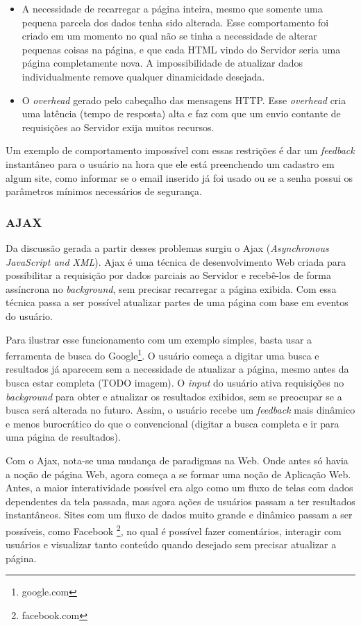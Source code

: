 \documentclass[a4paper,12pt]{article}
\begin{document}
\begin{itemize}
    \item A necessidade de recarregar a página inteira, mesmo que somente uma pequena parcela dos dados tenha sido alterada. Esse comportamento foi criado em um momento no qual não se tinha a necessidade de alterar pequenas coisas na página, e que cada HTML vindo do Servidor seria uma página completamente nova. A impossibilidade de atualizar dados individualmente remove qualquer dinamicidade desejada.

    \item O \emph{overhead} gerado pelo cabeçalho das mensagens HTTP. Esse \emph{overhead} cria uma latência (tempo de resposta) alta e faz com que um envio contante de requisições ao Servidor exija muitos recursos.
\end{itemize}

Um exemplo de comportamento impossível com essas restrições é dar um \emph{feedback} instantâneo para o usuário na hora que ele está preenchendo um cadastro em algum site, como informar se o email inserido já foi usado ou se a senha possui os parâmetros mínimos necessários de segurança.

\subsubsection{AJAX}
Da discussão gerada a partir desses problemas surgiu o Ajax (\emph{Asynchronous JavaScript and XML}). Ajax é uma técnica de desenvolvimento Web criada para possibilitar a requisição por dados parciais ao Servidor e recebê-los de forma assíncrona no \emph{background}, sem precisar recarregar a página exibida. Com essa técnica passa a ser possível atualizar partes de uma página com base em eventos do usuário.

Para ilustrar esse funcionamento com um exemplo simples, basta usar a ferramenta de busca do Google\footnote{google.com}. O usuário começa a digitar uma busca e resultados já aparecem sem a necessidade de atualizar a página, mesmo antes da busca estar completa (TODO imagem). O \emph{input} do usuário ativa requisições no \emph{background} para obter e atualizar os resultados exibidos, sem se preocupar se a busca será alterada no futuro. Assim, o usuário recebe um \emph{feedback} mais dinâmico e menos burocrático do que o convencional (digitar a busca completa e ir para uma página de resultados).

Com o Ajax, nota-se uma mudança de paradigmas na Web. Onde antes só havia a noção de página Web, agora começa a se formar uma noção de Aplicação Web. Antes, a maior interatividade possível era algo como um fluxo de telas com dados dependentes da tela passada, mas agora ações de usuários passam a ter resultados instantâneos. Sites com um fluxo de dados muito grande e dinâmico passam a ser possíveis, como Facebook \footnote{facebook.com}, no qual é possível fazer comentários, interagir com usuários e visualizar tanto conteúdo quando desejado sem precisar atualizar a página.
\end{document}

